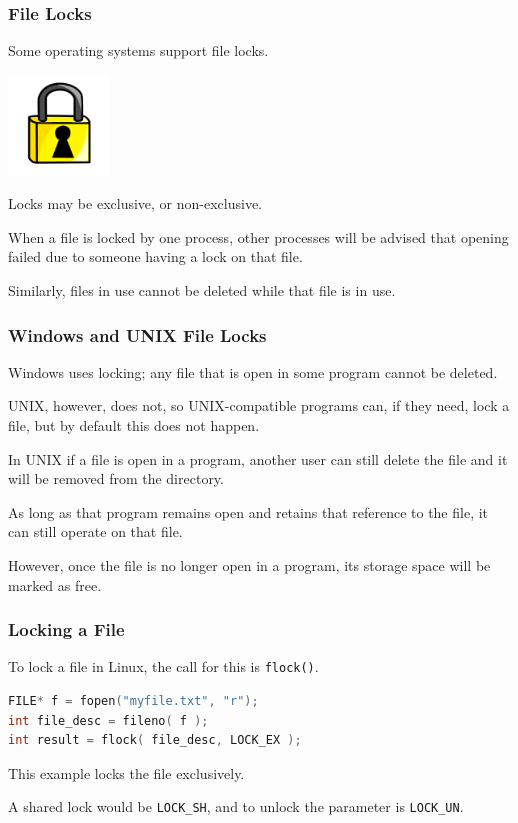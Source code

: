 \begin{frame}
	\frametitle{File Locks}

	Some operating systems support file locks.

	\begin{center}
		\includegraphics[width=0.2\textwidth]{images/file-lock}
	\end{center}

	Locks may be exclusive, or non-exclusive.

	When a file is locked by one process, other processes will be advised that opening failed due to someone having a lock on that file.

	Similarly, files in use cannot be deleted while that file is in use.

\end{frame}

\begin{frame}
	\frametitle{Windows and UNIX File Locks}

	Windows uses locking; any file that is open in some program cannot be deleted.

	UNIX, however, does not, so UNIX-compatible programs can, if they need, lock a file, but by default this does not happen.

	In UNIX if a file is open in a program, another user can still delete the file and it will be removed from the directory.

	As long as that program remains open and retains that reference to the file, it can still operate on that file.

	However, once the file is no longer open in a program, its storage space will be marked as free.

\end{frame}


\begin{frame}[fragile]
	\frametitle{Locking a File}
	To lock a file in Linux, the call for this is \texttt{flock()}.

	\begin{lstlisting}[language=C]
FILE* f = fopen("myfile.txt", "r");
int file_desc = fileno( f );
int result = flock( file_desc, LOCK_EX );
\end{lstlisting}

	This example locks the file exclusively.

	A shared lock would be \texttt{LOCK\_SH}, and to unlock the parameter is \texttt{LOCK\_UN}.

\end{frame}


